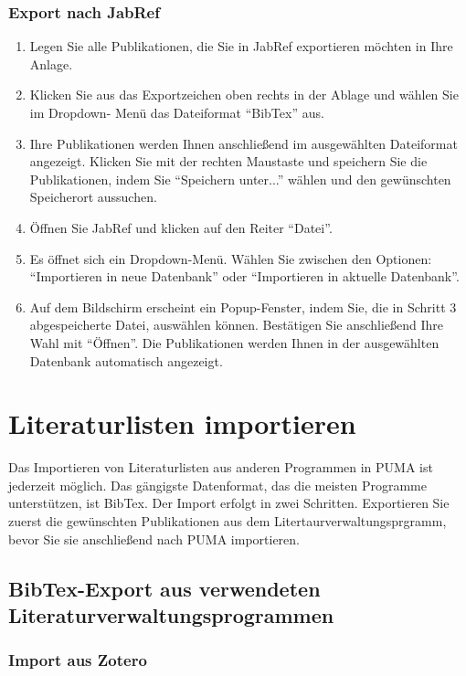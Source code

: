 \subsubsection*{Export nach JabRef}\label{sss:exportJabref}
\begin{enumerate}
    \item Legen Sie alle Publikationen, die Sie in JabRef exportieren möchten in Ihre Anlage.
    \item Klicken Sie aus das Exportzeichen oben rechts in der Ablage und wählen Sie im Dropdown- Menü das Dateiformat \enquote{BibTex} aus.
    \item Ihre Publikationen werden Ihnen anschließend im ausgewählten Dateiformat angezeigt. Klicken Sie mit der rechten Maustaste und speichern Sie die Publikationen, indem Sie \enquote{Speichern unter...} wählen und den gewünschten Speicherort aussuchen. 
    \item Öffnen Sie JabRef und klicken auf den Reiter \enquote{Datei}. 
    \item Es öffnet sich ein Dropdown-Menü. Wählen Sie zwischen den Optionen: \enquote{Importieren in neue Datenbank} oder \enquote{Importieren in aktuelle Datenbank}.
    \item Auf dem Bildschirm erscheint ein Popup-Fenster, indem Sie, die in Schritt 3 abgespeicherte Datei, auswählen können. Bestätigen Sie anschließend Ihre Wahl mit \enquote{Öffnen}. Die Publikationen werden Ihnen in der ausgewählten Datenbank automatisch angezeigt.
\end{enumerate}

\section{Literaturlisten importieren}
\label{sec:llImportieren}
Das Importieren von Literaturlisten aus anderen Programmen in PUMA ist jederzeit möglich. Das gängigste Datenformat, das die meisten Programme unterstützen, ist BibTex. \newline 
Der Import erfolgt in zwei Schritten. Exportieren Sie zuerst die gewünschten Publikationen aus dem Litertaurverwaltungsprgramm, bevor Sie sie anschließend nach PUMA importieren. 
\subsection{BibTex-Export aus verwendeten Literaturverwaltungsprogrammen}
\label{subsec:bibtexExport}
\subsubsection*{Import aus Zotero} \label{sss:importZotero}

